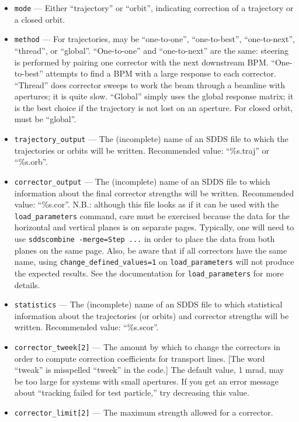 \documentclass[11pt]{article}
\begin{document}
\begin{itemize}

\item \verb|mode| --- Either ``trajectory'' or ``orbit'', indicating
correction of a trajectory or a closed orbit.
\item \verb|method| --- For trajectories, may be ``one-to-one'', ``one-to-best'', ``one-to-next'', ``thread'', or ``global''.  
``One-to-one'' and ``one-to-next'' are the same: steering is performed by pairing one corrector with the next downstream BPM.
``One-to-best'' attempts to find a BPM with a large response to each corrector.  ``Thread'' does corrector sweeps to work the
beam through a beamline with apertures; it is quite slow.  ``Global'' simply uses the global response matrix; it is the best
choice if the trajectory is not lost on an aperture.
For closed orbit, must be ``global''.
\item \verb|trajectory_output| --- The (incomplete) name of an SDDS file to which the trajectories or orbits will be written.  Recommended value: ``\%s.traj'' or ``\%s.orb''.  
\item \verb|corrector_output| --- The (incomplete) name of an SDDS file to which information about the final corrector strengths will be written. Recommended value: ``\%s.cor''.  N.B.: although this file looks as if it can be used with the \verb|load_parameters| command, care must be exercised because the data for the
horizontal and vertical planes is on separate pages. Typically, one will need to use \verb|sddscombine -merge=Step ...| in order to place the data from both planes on the same page. Also, be aware that if all correctors have the same name, using \verb|change_defined_values=1| on \verb|load_parameters| will not produce the expected results. See the documentation for \verb|load_parameters| for more details.
\item \verb|statistics| --- The (incomplete) name of an SDDS file to which statistical information about the
trajectories (or orbits) and corrector strengths will be written.  Recommended value: ``\%s.scor''.
\item \verb|corrector_tweek[2]| --- The amount by which to change the correctors in order to compute correction coefficients for
transport lines.
[The word ``tweak'' is misspelled ``tweek'' in the code.]   The default value, 1 mrad, may be too large for systems with
small apertures.  If you get an error message about ``tracking failed for test particle,'' try decreasing this value.
\item \verb|corrector_limit[2]| --- The maximum strength allowed for a corrector.

\end{itemize}
\end{document}
